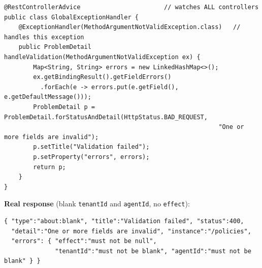 \documentclass[11pt,a4paper]{article}
\newcommand{\code}[1]{\texttt{\small #1}}
\begin{document}
\begin{center}
\end{center}

\begin{lstlisting}
@RestControllerAdvice                       // watches ALL controllers
public class GlobalExceptionHandler {
    @ExceptionHandler(MethodArgumentNotValidException.class)   // handles this exception
    public ProblemDetail handleValidation(MethodArgumentNotValidException ex) {
        Map<String, String> errors = new LinkedHashMap<>();
        ex.getBindingResult().getFieldErrors()
          .forEach(e -> errors.put(e.getField(), e.getDefaultMessage()));
        ProblemDetail p = ProblemDetail.forStatusAndDetail(HttpStatus.BAD_REQUEST,
                                                           "One or more fields are invalid");
        p.setTitle("Validation failed");
        p.setProperty("errors", errors);
        return p;
    }
}
\end{lstlisting}

\textbf{Real response} (blank \code{tenantId} and \code{agentId}, no \code{effect}):
\begin{lstlisting}[language={}]
{ "type":"about:blank", "title":"Validation failed", "status":400,
  "detail":"One or more fields are invalid", "instance":"/policies",
  "errors": { "effect":"must not be null",
              "tenantId":"must not be blank", "agentId":"must not be blank" } }
\end{lstlisting}
\end{document}
